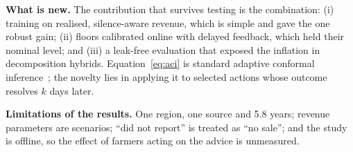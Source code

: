 \noindent\textbf{What is new.} The contribution that survives testing is the combination: (i) training on realised, silence-aware revenue, which is simple and gave the one robust gain; (ii) floors calibrated online with delayed feedback, which held their nominal level; and (iii) a leak-free evaluation that exposed the inflation in decomposition hybrids. Equation~\ref{eq:aci} is standard adaptive conformal inference~\cite{gibbs2021}; the novelty lies in applying it to selected actions whose outcome resolves $k$ days later.

\noindent\textbf{Limitations of the results.} One region, one source and 5.8 years; revenue parameters are scenarios; ``did not report'' is treated as ``no sale''; and the study is offline, so the effect of farmers acting on the advice is unmeasured.\par
